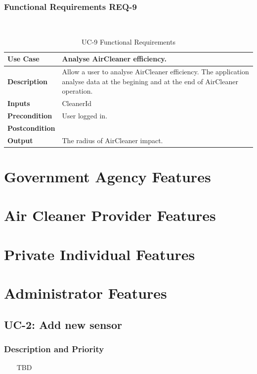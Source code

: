 \documentclass{report}
\begin{document}
\subsubsection*{Functional Requirements REQ-9} ~~~
\begin{table}[H]
	\begin{center}
		\begin{tabular}{|m{4cm}|m{10cm}|}
		\hline
		\textbf{Use Case} & Analyse AirCleaner efficiency. \\
		\hline
		\textbf{Description} & Allow a user to analyse AirCleaner efficiency. The application analyse data at the begining and at the end of AirCleaner operation. \\
		\hline
		\textbf{Inputs} & CleanerId\\
		\hline
		\textbf{Precondition} & User logged in. \\
		\hline
		\textbf{Postcondition} &  \\
		\hline
		\textbf{Output} & The radius of AirCleaner impact. \\
		\hline
		\end{tabular}
	\end{center}
	\caption{UC-9 Functional Requirements}
	\label{table:REQ-9}
\end{table}

\section{Government Agency Features}
\section{Air Cleaner Provider Features}
\section{Private Individual Features}
\section{Administrator Features}

\subsection{UC-2: Add new sensor}

\subsubsection*{Description and Priority} ~~~
TBD
\end{document}
